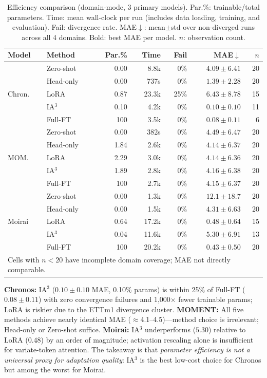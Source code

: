 \documentclass{article}
\begin{document}
\begin{table}[t]
\centering
\caption{Efficiency comparison (domain-mode, 3 primary models). Par.\%: trainable/total parameters. Time: mean wall-clock per run (includes data loading, training, and evaluation). Fail: divergence rate. MAE$\downarrow$: mean$\pm$std over non-diverged runs across all 4 domains. Bold: best MAE per model. $n$: observation count.}
\label{tab:efficiency}
\small
\begin{tabular}{llrrrrr}
\toprule
Model & Method & Par.\% & Time & Fail & MAE$\downarrow$ & $n$ \\
\midrule
\multirow{5}{*}{Chron.}
& Zero-shot & 0.00  & 8.8k & 0\%  & $4.09 \pm 6.41$  & 20 \\
& Head-only & 0.00  & 737s & 0\%  & $1.39 \pm 2.28$  & 20 \\
& LoRA      & 0.87  & 23.3k & 25\% & $6.43 \pm 8.78$  & 15 \\
& IA$^3$    & 0.10  & 4.2k & 0\%  & $0.10 \pm 0.10$  & 11 \\
& Full-FT   & 100   & 3.5k & 0\%  & $\mathbf{0.08 \pm 0.11}$ & 6 \\
\midrule
\multirow{5}{*}{MOM.}
& Zero-shot & 0.00  & 382s & 0\%  & $4.49 \pm 6.47$  & 20 \\
& Head-only & 1.84  & 2.6k & 0\%  & $\mathbf{4.14 \pm 6.37}$ & 20 \\
& LoRA      & 2.29  & 3.0k & 0\%  & $4.14 \pm 6.36$  & 20 \\
& IA$^3$    & 1.89  & 2.8k & 0\%  & $4.16 \pm 6.38$  & 20 \\
& Full-FT   & 100   & 2.7k & 0\%  & $4.15 \pm 6.37$  & 20 \\
\midrule
\multirow{5}{*}{Moirai}
& Zero-shot & 0.00  & 1.3k & 0\%  & $12.1 \pm 18.7$  & 20 \\
& Head-only & 0.00  & 1.5k & 0\%  & $4.31 \pm 6.63$  & 20 \\
& LoRA      & 0.64  & 17.2k & 0\% & $0.48 \pm 0.64$  & 15 \\
& IA$^3$    & 0.04  & 11.6k & 0\% & $5.30 \pm 6.91$  & 13 \\
& Full-FT   & 100   & 20.2k & 0\% & $\mathbf{0.43 \pm 0.50}$ & 20 \\
\bottomrule
\multicolumn{7}{l}{\scriptsize Cells with $n < 20$ have incomplete domain coverage; MAE not directly comparable.} \\
\end{tabular}
\end{table}

\textbf{Chronos:} IA$^3$ ($0.10 \pm 0.10$ MAE, 0.10\% params) is within 25\% of Full-FT ($0.08 \pm 0.11$) with zero convergence failures and 1,000$\times$ fewer trainable params; LoRA is riskier due to the ETTm1 divergence cluster. \textbf{MOMENT:} All five methods achieve nearly identical MAE ($\approx$4.1--4.5)---method choice is irrelevant; Head-only or Zero-shot suffice. \textbf{Moirai:} IA$^3$ underperforms ($5.30$) relative to LoRA ($0.48$) by an order of magnitude; activation rescaling alone is insufficient for variate-token attention. The takeaway is that \emph{parameter efficiency is not a universal proxy for adaptation quality}: IA$^3$ is the best low-cost choice for Chronos but among the worst for Moirai.
\end{document}
